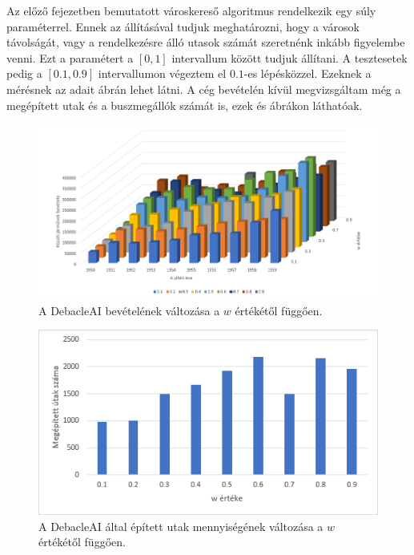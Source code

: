 
Az előző fejezetben bemutatott városkereső algoritmus rendelkezik egy súly paraméterrel. Ennek az állításával tudjuk meghatározni, hogy a városok távolságát, vagy a rendelkezésre álló utasok számát szeretnénk inkább figyelembe venni.  Ezt a paramétert a $[0,1]$ intervallum között tudjuk állítani. A tesztesetek pedig a $[0.1,0.9]$ intervallumon végeztem el $0.1$-es lépésközzel. Ezeknek a mérésnek az adait  ábrán lehet látni. A cég bevételén kívül megvizsgáltam még a megépített utak és a buszmegállók számát is, ezek  és  ábrákon láthatóak.

\begin{figure}
	\centering
	\includegraphics[scale=0.65]{images/wmeresek.png}
	\caption{A DebacleAI bevételének változása a $w$ értékétől függően.}
	\label{fig:meresek}
\end{figure}

\begin{figure}
	\centering
	\includegraphics[scale=1]{images/wutak.png}
	\caption{A DebacleAI által épített utak mennyiségének változása a $w$ értékétől függően.}
	\label{fig:utak}
\end{figure}

